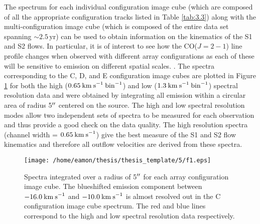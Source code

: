 The spectrum for each individual configuration image cube (which are composed of all the appropriate configuration tracks listed in Table \ref{tab:3.3}) along with the multi-configuration image cube (which is composed of the entire data set  spanning $\sim 2.5$\,yr) can be used to obtain information on the kinematics of the S1 and S2 flows. In particular, it is of interest to see how the CO($J=2-1$) line profile changes when observed  with different array configurations as each of these will be sensitive to emission on different spatial scales. . The spectra corresponding  to the C, D, and E configuration image cubes are plotted in Figure \ref{fig:5.4} for both the high ($0.65\>{\rm km\>s}^{-1}\> \rm{bin}^{-1}$) and low ($1.3\>{\rm km\>s}^{-1}\> \rm{bin}^{-1}$) spectral resolution data and were obtained by integrating all emission within a circular area of radius 5$^{\prime\prime}$ centered on the source. The high and low spectral resolution modes allow two independent sets of spectra to be measured for each observation and thus provide a good check on the data quality. The high resolution  spectra (channel width = $0.65\>{\rm km\>s}^{-1}$) give the best measure of the S1 and S2 flow kinematics and therefore all outflow velocities are derived from these spectra.

\begin{figure}[!ht]
\centering 
\texttt{[image: /home/eamon/thesis/thesis\_template/5/f1.eps]}
\caption{Spectra integrated over a radius of 5$^{\prime\prime}$ for each array configuration image cube. The blueshifted emission component between $-16.0\>{\rm km\>s}^{-1}$ and $-10.0\>{\rm km\>s}^{-1}$ is almost resolved out in the C configuration image cube spectrum. The red and blue lines correspond to the high and low spectral resolution data respectively.}
\label{fig:5.4}
\end{figure}

